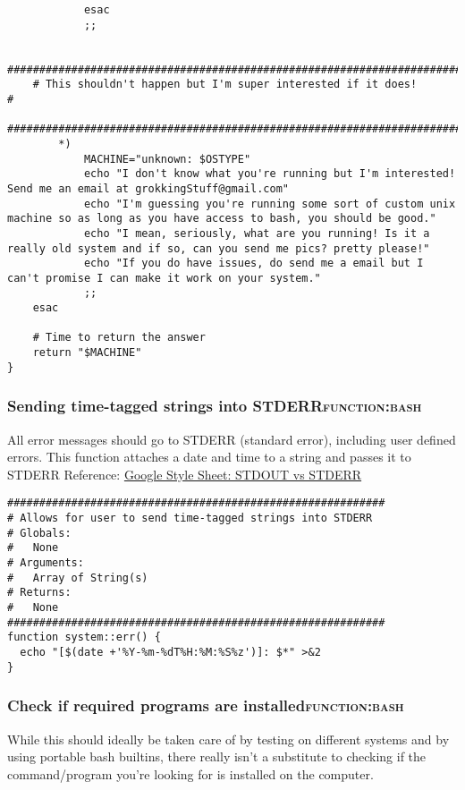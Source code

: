 \documentclass[11pt]{article}
\begin{document}
\begin{verbatim}
            esac
            ;;

    #########################################################################
    # This shouldn't happen but I'm super interested if it does!            #
    #########################################################################
        *)
            MACHINE="unknown: $OSTYPE"
            echo "I don't know what you're running but I'm interested! Send me an email at grokkingStuff@gmail.com"
            echo "I'm guessing you're running some sort of custom unix machine so as long as you have access to bash, you should be good."
            echo "I mean, seriously, what are you running! Is it a really old system and if so, can you send me pics? pretty please!"
            echo "If you do have issues, do send me a email but I can't promise I can make it work on your system."
            ;;
    esac

    # Time to return the answer
    return "$MACHINE"
}
\end{verbatim}

\subsubsection{Sending time-tagged strings into STDERR\hfill{}\textsc{function:bash}}
\label{sec:org436e962}

All error messages should go to STDERR (standard error), including user defined errors. This function attaches a date and time to a string and passes it to STDERR
Reference: \href{https://google.github.io/styleguide/shell.xml?showone=STDOUT\_vs\_STDERR\#STDOUT\_vs\_STDERR}{Google Style Sheet: STDOUT vs STDERR}

\begin{verbatim}
###########################################################
# Allows for user to send time-tagged strings into STDERR
# Globals:
#   None
# Arguments:
#   Array of String(s)
# Returns:
#   None
###########################################################
function system::err() {
  echo "[$(date +'%Y-%m-%dT%H:%M:%S%z')]: $*" >&2
}
\end{verbatim}

\subsubsection{Check if required programs are installed\hfill{}\textsc{function:bash}}
\label{sec:org6ca7f37}
While this should ideally be taken care of by testing on different systems and by using portable bash builtins, there really isn't a substitute to checking if the command/program you're looking for is installed on the computer.
\end{document}
